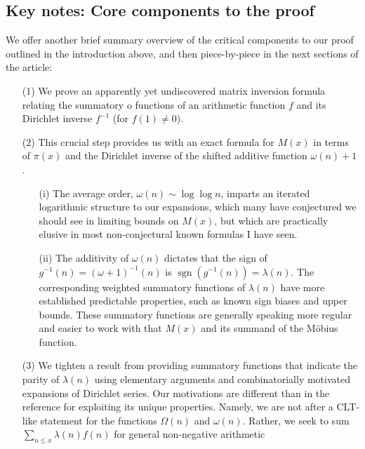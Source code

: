 \documentclass[11pt,reqno,a4letter]{article}
\numberwithin{figure}{section}
\numberwithin{table}{section}
\theoremstyle{plain}
\numberwithin{theorem}{section}
\theoremstyle{definition}
\begin{document}
\subsection{Key notes: Core components to the proof} 

We offer another brief summary overview of the critical components to our proof outlined in the introduction above, 
and then piece-by-piece in the next sections of the article:
\begin{itemize} 

\item[(1)] We prove an apparently yet undiscovered matrix inversion formula relating the summatory o
           functions of an arithmetic function $f$ and its Dirichlet inverse $f^{-1}$ (for $f(1) \neq 0$). 
\item[(2)] This crucial step provides us with an exact formula for $M(x)$ in terms of $\pi(x)$ and the 
           Dirichlet inverse of the shifted additive function $\omega(n)+1$. 
           \begin{itemize} 
           \item[(i)] The average order, $\omega(n) \sim \log\log n$, imparts an iterated logarithmic structure 
           to our expansions, which many have conjectured we should see in limiting bounds on $M(x)$, 
           but which are practically elusive in most non-conjectural known formulas I have seen. 
           \item[(ii)] The additivity of $\omega(n)$ dictates that the sign of $g^{-1}(n) = (\omega+1)^{-1}(n)$ 
           is $\operatorname{sgn}(g^{-1}(n)) = \lambda(n)$. The corresponding weighted summatory functions of 
           $\lambda(n)$ have more established predictable properties, such as known sign biases and upper bounds. 
           These summatory functions are generally speaking more regular and easier to work with that $M(x)$ 
           and its summand of the M\"obius function. 
           \end{itemize}
\item[(3)] We tighten a result from \cite[\S 7]{MV} providing summatory functions that indicate the parity of 
           $\lambda(n)$ using elementary arguments and combinatorially motivated expansions of Dirichlet series. 
           Our motivations are different than in the reference for exploiting its unique properties. 
           Namely, we are not after a CLT-like statement for the functions $\Omega(n)$ and $\omega(n)$. 
           Rather, we seek to sum $\sum_{n \leq x} \lambda(n) f(n)$ for general non-negative arithmetic 

\end{itemize}
\end{document}
